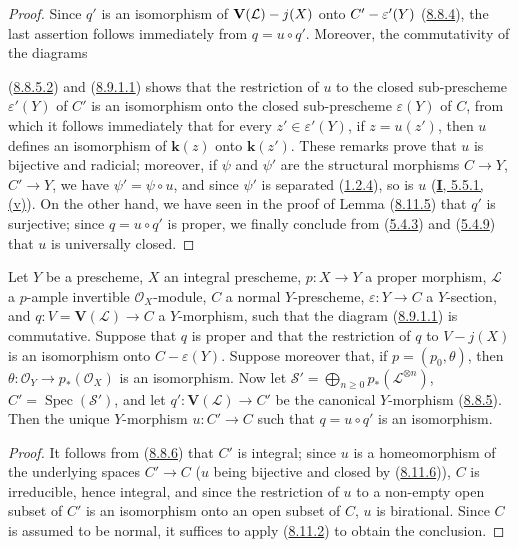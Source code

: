 \begin{proof}
Since $q'$ is an isomorphism of $\mathbf{V}(\mathcal{L})- j(X)$ onto
$C'-\varepsilon'(Y)$ (\hyperref[II.8.8.4]{8.8.4}), the last assertion
follows immediately from $q=u\circ q'$. Moreover, the commutativity of the
diagrams

(\hyperref[II.8.8.5.2]{8.8.5.2}) and
(\hyperref[II.8.9.1.1]{8.9.1.1}) shows that the restriction of $u$ to the
closed sub-prescheme $\varepsilon'(Y)$ of $C'$ is an isomorphism onto the
closed sub-prescheme $\varepsilon(Y)$ of $C$, from which it follows
immediately that for every $z'\in\varepsilon'(Y)$, if $z=u(z')$, then $u$
defines an isomorphism of $\boldsymbol{k}(z)$ onto $\boldsymbol{k}(z')$. These remarks prove that $u$
is bijective and radicial; moreover, if $\psi$ and $\psi'$ are the structural
morphisms $C\to Y$, $C'\to Y$, we have $\psi'=\psi\circ u$, and since $\psi'$
is separated (\hyperref[II.1.2.4]{1.2.4}), so is $u$
(\hyperref[I.5.5.1]{\textbf{I}, 5.5.1, (v)}). On the other hand, we have seen in the
proof of Lemma (\hyperref[II.8.11.5]{8.11.5}) that $q'$ is
surjective; since $q=u\circ q'$ is proper, we finally conclude from
(\hyperref[II.5.4.3]{5.4.3}) and (\hyperref[II.5.4.9]{5.4.9}) that $u$
is universally closed.
\end{proof}

\begin{proposition}[8.11.7]
\label{II.8.11.7}
Let $Y$ be a prescheme, $X$ an \textup{integral} prescheme, $p:X\to Y$ a proper
morphism, $\mathcal{L}$ a $p$-ample invertible $\mathcal{O}_X$-module, $C$ a
\textup{normal} $Y$-prescheme, $\varepsilon:Y\to C$ a $Y$-section, and
$q:V=\mathbf{V}(\mathcal{L})\to C$ a $Y$-morphism, such that the diagram
\textup{(\hyperref[II.8.9.1.1]{8.9.1.1})} is commutative. Suppose that $q$ is
proper and that the restriction of $q$ to $V-j(X)$ is an isomorphism onto
$C-\varepsilon(Y)$. Suppose moreover that,
if $p=(p_0,\theta)$, then $\theta:\mathcal{O}_Y\to p_*(\mathcal{O}_X)$ is an
isomorphism. Now let
$\mathcal{S}'=\bigoplus_{n\geqslant0}p_*(\mathcal{L}^{\otimes n})$,
$C'=\operatorname{Spec}(\mathcal{S}')$, \textup{and} let
$q':\mathbf{V}(\mathcal{L})\to C'$ be the canonical $Y$-morphism
\textup{(\hyperref[II.8.8.5]{8.8.5})}. Then the unique $Y$-morphism $u:C'\to C$ such
that $q=u\circ q'$ is an \textup{isomorphism}.
\end{proposition}

\begin{proof}
It follows from (\hyperref[II.8.8.6]{8.8.6}) that $C'$ is integral; since
$u$ is a homeomorphism of the underlying spaces $C'\to C$ ($u$ being
bijective and closed by (\hyperref[II.8.11.6]{8.11.6})), $C$ is
irreducible, hence integral, and since the restriction of $u$ to a non-empty
open subset of $C'$ is an isomorphism onto an open subset of $C$, $u$ is
birational. Since $C$ is assumed to be normal, it suffices to apply
(\hyperref[II.8.11.2]{8.11.2}) to obtain the conclusion.
\end{proof}

